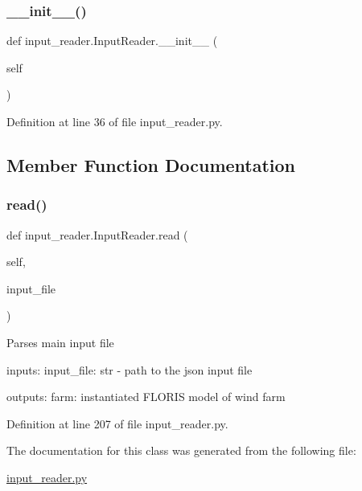 \subsubsection{\texorpdfstring{\+\_\+\+\_\+init\+\_\+\+\_\+()}{\_\_init\_\_()}}
{\footnotesize\ttfamily def input\+\_\+reader.\+Input\+Reader.\+\_\+\+\_\+init\+\_\+\+\_\+ (\begin{DoxyParamCaption}\item[{}]{self }\end{DoxyParamCaption})}



Definition at line 36 of file input\+\_\+reader.\+py.



\subsection{Member Function Documentation}
\mbox{\label{classinput__reader_1_1_input_reader_a01b4a6e2f28f3f0356a6e4aeb5bb2781}} 
\subsubsection{\texorpdfstring{read()}{read()}}
{\footnotesize\ttfamily def input\+\_\+reader.\+Input\+Reader.\+read (\begin{DoxyParamCaption}\item[{}]{self,  }\item[{}]{input\+\_\+file }\end{DoxyParamCaption})}

\begin{DoxyVerb}Parses main input file

inputs:
    input_file: str - path to the json input file

outputs:
    farm: instantiated FLORIS model of wind farm
\end{DoxyVerb}
 

Definition at line 207 of file input\+\_\+reader.\+py.



The documentation for this class was generated from the following file\+:\begin{DoxyCompactItemize}
\item 
\mbox{\hyperlink{input__reader_8py}{input\+\_\+reader.\+py}}\end{DoxyCompactItemize}
